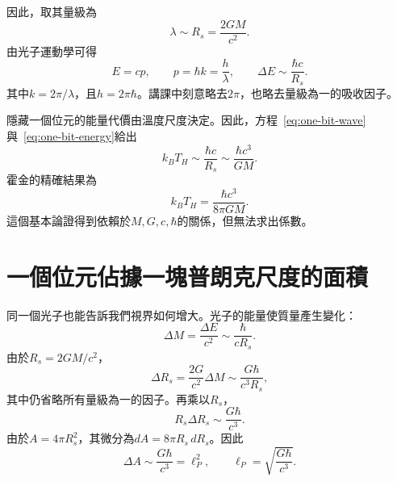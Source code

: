 \begin{classroomqa}
\end{classroomqa}

因此，取其量級為
\begin{equation}
\lambda\sim R_s=\frac{2GM}{c^2}.
\label{eq:one-bit-wave}
\end{equation}
由光子運動學可得
\begin{equation}
E=cp,
\qquad
p=\hbar k=\frac{h}{\lambda},
\qquad
\Delta E\sim\frac{\hbar c}{R_s}.
\label{eq:one-bit-energy}
\end{equation}
其中\(k=2\pi/\lambda\)，且\(h=2\pi\hbar\)。講課中刻意略去\(2\pi\)，也略去量級為一的吸收因子。

\begin{classroomqa}
\end{classroomqa}

隱藏一個位元的能量代價由溫度尺度決定。因此，方程~\eqref{eq:one-bit-wave}與~\eqref{eq:one-bit-energy}給出
\begin{equation}
k_BT_H\sim\frac{\hbar c}{R_s}
\sim\frac{\hbar c^3}{GM}.
\end{equation}
霍金的精確結果為
\begin{equation}
k_BT_H=\frac{\hbar c^3}{8\pi GM}.
\end{equation}
這個基本論證得到依賴於\(M,G,c,\hbar\)的關係，但無法求出係數。

\section{一個位元佔據一塊普朗克尺度的面積}

同一個光子也能告訴我們視界如何增大。光子的能量使質量產生變化：
\begin{equation}
\Delta M=\frac{\Delta E}{c^2}
\sim\frac{\hbar}{cR_s}.
\end{equation}
由於\(R_s=2GM/c^2\)，
\begin{equation}
\Delta R_s=\frac{2G}{c^2}\Delta M
\sim\frac{G\hbar}{c^3R_s},
\end{equation}
其中仍省略所有量級為一的因子。再乘以\(R_s\)，
\begin{equation}
R_s\Delta R_s\sim\frac{G\hbar}{c^3}.
\end{equation}
由於\(A=4\pi R_s^2\)，其微分為\(dA=8\pi R_s\,dR_s\)。因此
\begin{equation}
\Delta A\sim\frac{G\hbar}{c^3}=\ell_P^2,
\qquad
\ell_P=\sqrt{\frac{G\hbar}{c^3}}.
\label{eq:planck-patch}
\end{equation}


